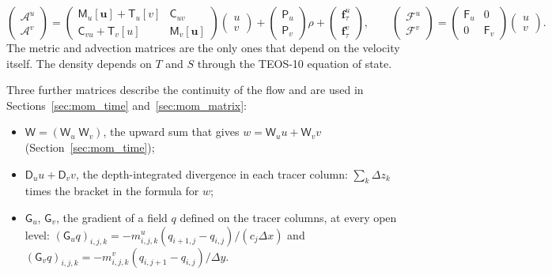 \documentclass{article}
\begin{document}
\begin{equation}
\begin{pmatrix}\mathcal{A}^u\\ \mathcal{A}^v\end{pmatrix}
= \begin{pmatrix} \mathsf{M}_u[\mathbf{u}] + \mathsf{T}_u[v] & \mathsf{C}_{uv} \\ \mathsf{C}_{vu} + \mathsf{T}_v[u] & \mathsf{M}_v[\mathbf{u}] \end{pmatrix}
\begin{pmatrix} u\\ v\end{pmatrix}
+ \begin{pmatrix}\mathsf{P}_u\\ \mathsf{P}_v\end{pmatrix}\rho
+ \begin{pmatrix}\mathbf{f}^u_\tau\\ \mathbf{f}^v_\tau\end{pmatrix},
\qquad
\begin{pmatrix}\mathcal{F}^u\\ \mathcal{F}^v\end{pmatrix}
= \begin{pmatrix}\mathsf{F}_u & 0\\ 0 & \mathsf{F}_v\end{pmatrix}
\begin{pmatrix}u\\ v\end{pmatrix}.
\label{eq:mom_matrix}
\end{equation}
The metric and advection matrices are the only ones that depend on the velocity itself. The density depends on $T$ and $S$ through the TEOS-10 equation of state.

Three further matrices describe the continuity of the flow and are used in Sections~\ref{sec:mom_time} and~\ref{sec:mom_matrix}:
\begin{itemize}
\item $\mathsf{W} = (\mathsf{W}_u\;\mathsf{W}_v)$, the upward sum that gives $w = \mathsf{W}_u u + \mathsf{W}_v v$ (Section~\ref{sec:mom_time});
\item $\mathsf{D}_u u + \mathsf{D}_v v$, the depth-integrated divergence in each tracer column: $\sum_k \Delta z_k$ times the bracket in the formula for $w$;
\item $\mathsf{G}_u$, $\mathsf{G}_v$, the gradient of a field $q$ defined on the tracer columns, at every open level: $(\mathsf{G}_u q)_{i,j,k} = -m^u_{i,j,k}(q_{i+1,j} - q_{i,j})/(c_j\Delta x)$ and $(\mathsf{G}_v q)_{i,j,k} = -m^v_{i,j,k}(q_{i,j+1} - q_{i,j})/\Delta y$.
\end{itemize}
\end{document}
